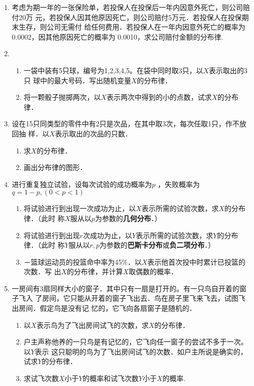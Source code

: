 \documentclass[10pt,a4paper]{article}
\begin{document}
\begin{enumerate}

    \item 考虑为期一年的一张保险单，若投保人在投保后一年内因意外死亡，则公司赔付20万
    元，若投保人因其他原因死亡，则公司赔付5万元．若投保人在投保期末生存，则公司无需付
    给任何费用．若投保人在一年内因意外死亡的概率为0.0002，因其他原因死亡的概率为
    0.0010，求公司赔付金额的分布律.


    \item \begin{enumerate}
        \item 一袋中装有5只球，编号为1,2,3,4,5。在袋中同时取3只，以$X$表示取出的3只
        球中的最大号码．写出随机变量$X$的分布律．
        \item 将一颗骰子抛掷两次，以$X$表示两次中得到的小的点数，试求$X$的分布律．
    \end{enumerate}


    \item 设在15只同类型的零件中有2只是次品，在其中取3次，每次任取1只，作不放回抽
    样．以$X$表示取出的次品的只数．
    \begin{enumerate}
        \item 求$X$的分布律．
        \item 画出分布律的图形．
    \end{enumerate}



    \item 进行重复独立试验，设每次试验的成功概率为$p$ ，失败概率为$q=1-p,(0<p<1)$
    \begin{enumerate}
        \item 将试验进行到出现一次成功为止，以$X$表示所需的试验次数，求$X$的分布律．（此时
        称$X$服从以$p$为参数的\textbf{几何分布}．）
        \item 将试验进行到出现$r$次成功为止，以$Y$表示所需的试验次数，求$Y$的分布律．（此时
        称$Y$服从以$r,p$为参数的\textbf{巴斯卡分布}或\textbf{负二项分布}．）
        \item －篮球运动员的投篮命中率为45\%．以$X$表示他首次投中时累计已投篮的次数．写
        出$X$的分布律，并计算$X$取偶数的概率．
    \end{enumerate}


    \item 一房间有3扇同样大小的窗子．其中只有一扇是打开的。有一只鸟自开着的窗子飞入
    了房间，它只能从开着的窗子飞出去．鸟在房子里飞来飞去，试图飞出房间．假定鸟是没有记
    忆的，它飞向各扇窗子是随机的．
    \begin{enumerate}
        \item 以$X$表示鸟为了飞出房间试飞的次数，求$X$的分布律．
        \item 户主声称他养的一只鸟是有记忆的，它飞向任一窗子的尝试不多于一次。以$Y$表示
        这只聪明的鸟为了飞出房间试飞的次数．如户主所说是确实的，试求$Y$的分布律．
        \item 求试飞次数$X$小于$Y$的概率和试飞次数$Y$小于$X$的概率.
    \end{enumerate}



\end{enumerate}
\end{document}
